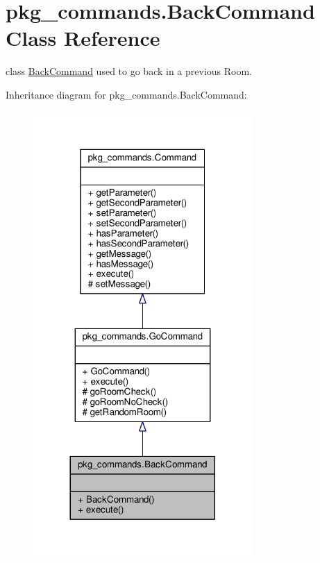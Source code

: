 \hypertarget{classpkg__commands_1_1BackCommand}{\section{pkg\-\_\-commands.\-Back\-Command Class Reference}
\label{classpkg__commands_1_1BackCommand}
}


class \hyperlink{classpkg__commands_1_1BackCommand}{Back\-Command} used to go back in a previous Room.  




Inheritance diagram for pkg\-\_\-commands.\-Back\-Command\-:
\nopagebreak
\begin{figure}[H]
\begin{center}
\leavevmode
\includegraphics[width=236pt]{classpkg__commands_1_1BackCommand__inherit__graph}
\end{center}
\end{figure}


